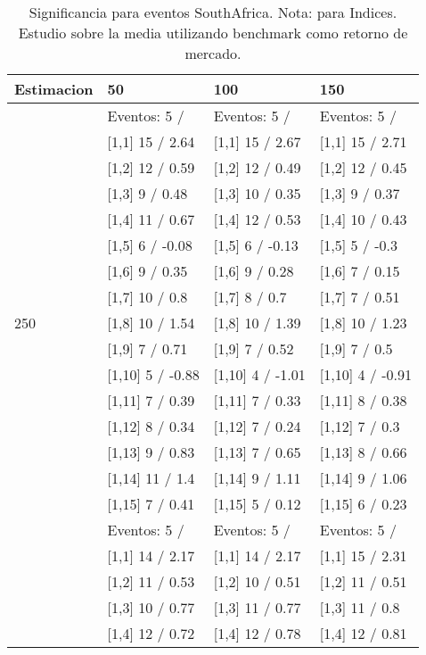 \begin{table}

\caption{Significancia para eventos SouthAfrica. Nota: para Indices. Estudio sobre la media utilizando benchmark como retorno de mercado.}
\centering
\begin{tabular}[t]{llll}
\toprule
Estimacion & 50 & 100 & 150\\
\midrule
 & Eventos:  5 / & Eventos:  5 / & Eventos:  5 /\\
 & {}[1,1] 15  / 2.64 & {}[1,1] 15  / 2.67 & {}[1,1] 15  / 2.71\\
 & {}[1,2] 12  / 0.59 & {}[1,2] 12  / 0.49 & {}[1,2] 12  / 0.45\\
 & {}[1,3] 9  / 0.48 & {}[1,3] 10  / 0.35 & {}[1,3] 9  / 0.37\\
 & {}[1,4] 11  / 0.67 & {}[1,4] 12  / 0.53 & {}[1,4] 10  / 0.43\\
\addlinespace
 & {}[1,5] 6  / -0.08 & {}[1,5] 6  / -0.13 & {}[1,5] 5  / -0.3\\
 & {}[1,6] 9  / 0.35 & {}[1,6] 9  / 0.28 & {}[1,6] 7  / 0.15\\
 & {}[1,7] 10  / 0.8 & {}[1,7] 8  / 0.7 & {}[1,7] 7  / 0.51\\
250 & {}[1,8] 10  / 1.54 & {}[1,8] 10  / 1.39 & {}[1,8] 10  / 1.23\\
 & {}[1,9] 7  / 0.71 & {}[1,9] 7  / 0.52 & {}[1,9] 7  / 0.5\\
\addlinespace
 & {}[1,10] 5  / -0.88 & {}[1,10] 4  / -1.01 & {}[1,10] 4  / -0.91\\
 & {}[1,11] 7  / 0.39 & {}[1,11] 7  / 0.33 & {}[1,11] 8  / 0.38\\
 & {}[1,12] 8  / 0.34 & {}[1,12] 7  / 0.24 & {}[1,12] 7  / 0.3\\
 & {}[1,13] 9  / 0.83 & {}[1,13] 7  / 0.65 & {}[1,13] 8  / 0.66\\
 & {}[1,14] 11  / 1.4 & {}[1,14] 9  / 1.11 & {}[1,14] 9  / 1.06\\
\addlinespace
 & {}[1,15] 7  / 0.41 & {}[1,15] 5  / 0.12 & {}[1,15] 6  / 0.23\\
 & Eventos:  5 / & Eventos:  5 / & Eventos:  5 /\\
 & {}[1,1] 14  / 2.17 & {}[1,1] 14  / 2.17 & {}[1,1] 15  / 2.31\\
 & {}[1,2] 11  / 0.53 & {}[1,2] 10  / 0.51 & {}[1,2] 11  / 0.51\\
 & {}[1,3] 10  / 0.77 & {}[1,3] 11  / 0.77 & {}[1,3] 11  / 0.8\\
\addlinespace
 & {}[1,4] 12  / 0.72 & {}[1,4] 12  / 0.78 & {}[1,4] 12  / 0.81\\

\end{tabular}
\end{table}
